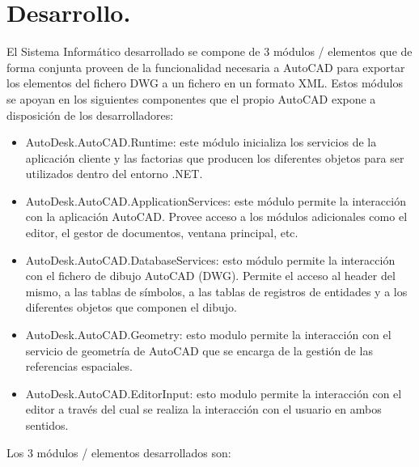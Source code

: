 \section{Desarrollo.}
El Sistema Informático desarrollado se compone de 3 módulos / elementos que de forma conjunta proveen de la funcionalidad necesaria a AutoCAD para exportar los elementos del fichero DWG a un fichero en un formato XML. Estos módulos se apoyan en los siguientes componentes que el propio AutoCAD expone a disposición de los desarrolladores:

\begin{itemize}

\item{AutoDesk.AutoCAD.Runtime: este módulo inicializa los servicios de la aplicación cliente y las factorias que producen los diferentes objetos para ser utilizados dentro del entorno .NET.}

\item{AutoDesk.AutoCAD.ApplicationServices: este módulo permite la interacción con la aplicación AutoCAD. Provee acceso a los módulos adicionales como el editor, el gestor de documentos, ventana principal, etc.}

\item{AutoDesk.AutoCAD.DatabaseServices: esto módulo permite la interacción con el fichero de dibujo AutoCAD (DWG). Permite el acceso al header del mismo, a las tablas de símbolos, a las tablas de registros de entidades y a los diferentes objetos que componen el dibujo.}

\item{AutoDesk.AutoCAD.Geometry: esto modulo permite la interacción con el servicio de geometría de AutoCAD que se encarga de la gestión de las referencias espaciales.}

\item{AutoDesk.AutoCAD.EditorInput: esto modulo permite la interacción con el editor a través del cual se realiza la interacción con el usuario en ambos sentidos.}

\end{itemize}

Los 3 módulos / elementos desarrollados son:


